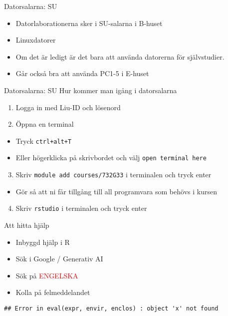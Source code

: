 \documentclass[
  10pt,
  ignorenonframetext,
]{beamer}
\providecommand{\tightlist}{%
  \setlength{\itemsep}{0pt}\setlength{\parskip}{0pt}}
\begin{document}
\begin{frame}{Datorsalarna: SU}
\protect\hypertarget{datorsalarna-su}{}
\begin{itemize}
\tightlist
\item
  Datorlaborationerna sker i SU-salarna i B-huset
\item
  Linuxdatorer
\item
  Om det är ledigt är det bara att använda datorerna för självstudier.
\item
  Går också bra att använda PC1-5 i E-huset
\end{itemize}
\end{frame}

\begin{frame}[fragile]{Datorsalarna: SU}
\protect\hypertarget{datorsalarna-su-1}{}
Hur kommer man igång i datorsalarna

\begin{enumerate}
\tightlist
\item
  Logga in med Liu-ID och lösenord
\item
  Öppna en terminal
\end{enumerate}

\begin{itemize}
\tightlist
\item
  Tryck \texttt{ctrl+alt+T}
\item
  Eller högerklicka på skrivbordet och välj
  \texttt{open\ terminal\ here}
\end{itemize}

\begin{enumerate}
\setcounter{enumi}{2}
\tightlist
\item
  Skriv \texttt{module\ add\ courses/732G33} i terminalen och tryck
  enter
\end{enumerate}

\begin{itemize}
\tightlist
\item
  Gör så att ni får tillgång till all programvara som behövs i kursen
\end{itemize}

\begin{enumerate}
\setcounter{enumi}{3}
\tightlist
\item
  Skriv \texttt{rstudio} i terminalen och tryck enter
\end{enumerate}
\end{frame}

\begin{frame}[fragile]{Att hitta hjälp}
\protect\hypertarget{att-hitta-hjuxe4lp}{}
\begin{itemize}
\tightlist
\item
  Inbyggd hjälp i R
\item
  Sök i Google / Generativ AI
\item
  Sök på \textcolor{red}{ENGELSKA}
\item
  Kolla på felmeddelandet
\end{itemize}

\begin{verbatim}
## Error in eval(expr, envir, enclos) : object 'x' not found
\end{verbatim}
\end{frame}
\end{document}
